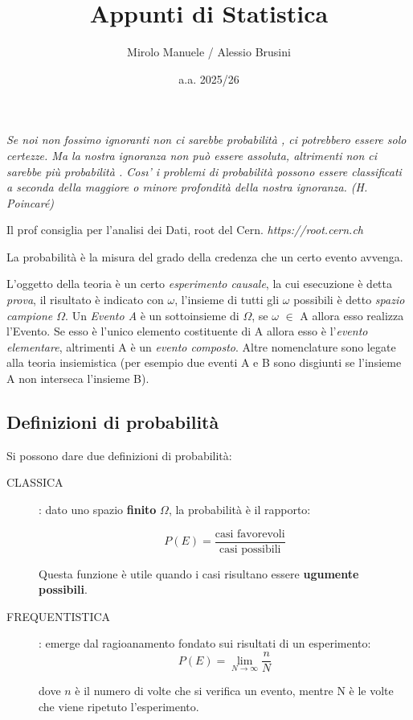 \documentclass{article}
\title{Appunti di Statistica }
\author{ Mirolo Manuele / Alessio Brusini}
\date{a.a. 2025/26}
\begin{document}
\maketitle
\justifying
\tableofcontents
\newpage

\textit{Se noi non fossimo ignoranti non ci sarebbe probabilità , ci potrebbero essere solo certezze. Ma la
nostra ignoranza non può essere assoluta, altrimenti non ci sarebbe più probabilità . Cosı’ i problemi di
probabilità possono essere classificati a seconda della maggiore o minore profondità della nostra
ignoranza.
(H. Poincaré)}

Il prof consiglia per l'analisi dei Dati, root del Cern. \textit{https://root.cern.ch}

La probabilità è la misura del grado della credenza che un certo evento avvenga.

L'oggetto della teoria è un certo \textit{esperimento causale}, la cui esecuzione è detta \textit{prova}, il risultato è indicato con \textit{$\omega$}, l'insieme di
tutti gli $\omega$ possibili è detto \textit{spazio campione $\Omega$}. Un \textit{Evento A} è un sottoinsieme di $\Omega$, se $\omega$ $\in$ A allora esso realizza l'Evento.
Se esso è l'unico elemento costituente di A allora esso è l'\textit{evento elementare}, altrimenti A è un \textit{evento composto}.
Altre nomenclature sono legate alla teoria insiemistica (per esempio due eventi A e B sono disgiunti se l'insieme A non interseca l'insieme B).
\subsection{Definizioni di probabilità}
Si possono dare due definizioni di probabilità:
\begin{description}

\item[CLASSICA]: dato uno spazio \textbf{finito} $\Omega$, la probabilità è il rapporto:

\[
P(E)= \frac{\text{casi favorevoli}}{\text{casi possibili}}
\]

Questa funzione è utile quando i casi risultano essere \textbf{ugumente possibili}.

\vspace{0.5cm}

\item[FREQUENTISTICA]: emerge dal ragioanamento fondato sui risultati di un esperimento:
\[
P(E)=\lim_{N \rightarrow \infty} \frac{n}{N}
\]

dove $n$ è il numero di volte che si verifica un evento, mentre N è le volte che viene ripetuto l'esperimento.
\end{description}
\end{document}
